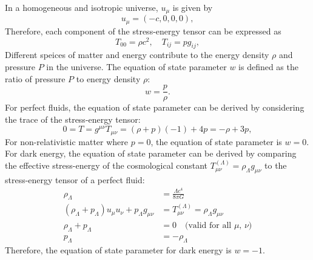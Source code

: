 In a homogeneous and isotropic universe, \( u_{\mu} \) is given by
\begin{equation}
    u_{\mu} = (-c, 0, 0, 0),
    \label{eq:four_velocity}
\end{equation}
Therefore, each component of the stress-energy tensor can be expressed as
\begin{equation}
    T_{00} = \rho c^2, \quad T_{ij} = p g_{ij},
    \label{eq:stress_energy_components}
\end{equation}
Different speices of matter and energy contribute to the energy density \( \rho \) and pressure \( P \) in the universe. The equation of state parameter \( w \) is defined as the ratio of pressure \( P \) to energy density \( \rho \):
\begin{equation}
    w = \frac{p}{\rho}.
    \label{eq:equation_of_state}
\end{equation}
For perfect fluids, the equation of state parameter can be derived by considering the trace of the stress-energy tensor:
\begin{equation}
    0 = T = g^{\mu\nu} T_{\mu\nu} = (\rho + p)(-1) + 4p = -\rho + 3p,
    \label{eq:stress_energy_trace}
\end{equation}
For non-relativistic matter where $p = 0$, the equation of state parameter is \( w = 0 \). 
For dark energy, the equation of state parameter can be derived by comparing the effective stress-energy of the cosmological constant $T_{\mu\nu}^{(\Lambda)} = \rho_{\Lambda} g_{\mu\nu}$ to the stress-energy tensor of a perfect fluid:
\begin{align}
    \rho_{\Lambda} &= \frac{\Lambda c^4}{8\pi G} \label{eq:lambda_density} \\
    \left(\rho_{\Lambda} + p_{\Lambda} \right) u_{\mu} u_{\nu} + p_{\Lambda} g_{\mu\nu} &= T_{\mu\nu}^{(\Lambda)} = \rho_{\Lambda} g_{\mu\nu}  \\
    \rho_{\Lambda} + p_{\Lambda} &= 0 \quad \text{(valid for all $\mu$, $\nu$)} \nonumber \\
    p_{\Lambda} &= -\rho_{\Lambda} \label{eq:lambda_pressure}
\end{align}
Therefore, the equation of state parameter for dark energy is \( w = -1 \).

